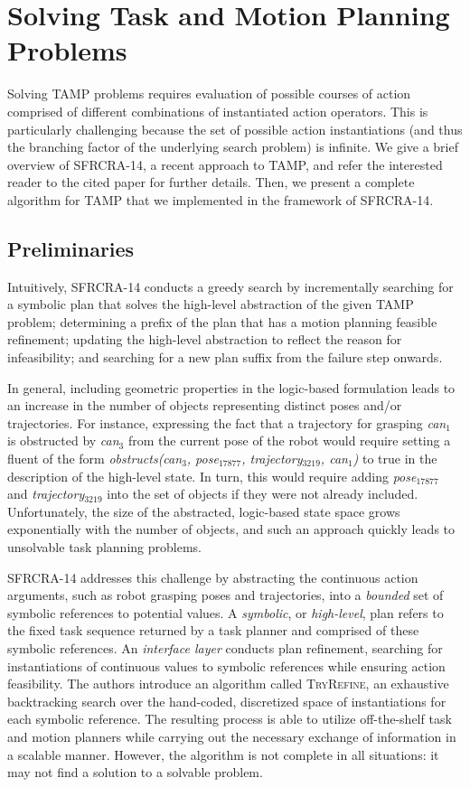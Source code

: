 \section{Solving Task and Motion Planning Problems}
Solving TAMP problems requires evaluation of
possible courses of action comprised of different combinations of
instantiated action operators. This is particularly challenging
because the set of possible action instantiations (and thus the
branching factor of the underlying search problem) is infinite.
We give a brief overview of SFRCRA-14, a recent approach to TAMP, and
refer the interested reader to the cited paper for further details.
Then, we present a complete algorithm for TAMP that we implemented in
the framework of SFRCRA-14.

\subsection{Preliminaries}
Intuitively, SFRCRA-14 conducts a greedy search by incrementally searching for a symbolic
plan that solves the high-level abstraction of the given TAMP problem;
determining a prefix of the plan that has a motion planning feasible refinement; updating the high-level abstraction to reflect the
reason for infeasibility; and searching for a new plan suffix from the failure step onwards.

In general, including geometric properties in the logic-based formulation leads to an
increase in the number of objects representing distinct poses and/or trajectories. For
instance, expressing the fact that a trajectory for grasping \emph{can$_1$} is obstructed by
\emph{can$_3$} from the current pose of the robot would require setting a fluent of the
form \emph{obstructs(can$_3$, pose$_{17877}$, trajectory$_{3219}$, can$_1$)} to true in
the description of the high-level state. In turn, this would require adding
\emph{pose$_{17877}$} and \emph{trajectory$_{3219}$} into the set of objects if they were
not already included. Unfortunately, the size of the abstracted, logic-based state space
grows exponentially with the number of objects, and such an approach quickly leads to
unsolvable task planning problems.

SFRCRA-14 addresses this challenge by abstracting the continuous action
arguments, such as robot grasping poses and trajectories, into a
\emph{bounded} set of symbolic references to potential values. A
\emph{symbolic}, or \emph{high-level}, plan refers to the fixed task
sequence returned by a task planner and comprised of these symbolic
references. An \emph{interface layer} conducts plan refinement, searching for instantiations of
continuous values to symbolic references while ensuring action
feasibility. The authors introduce an algorithm called \textsc{TryRefine}, an exhaustive backtracking search over
the hand-coded, discretized space of instantiations for each symbolic reference.
The resulting process is able to utilize off-the-shelf task and motion
planners while carrying out the necessary exchange of information in a
scalable manner. However, the algorithm is not complete in all situations: it may
not find a solution to a solvable problem.


